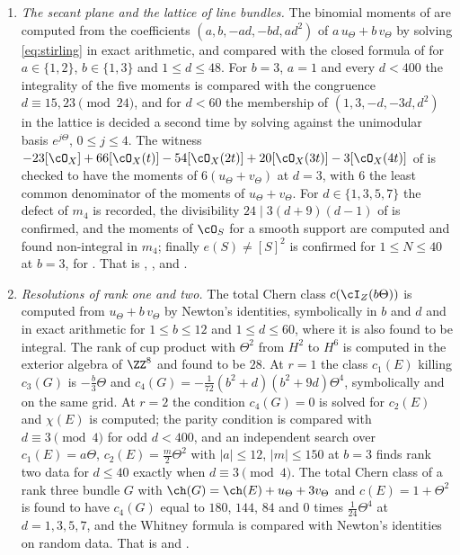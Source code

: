 \begin{enumerate}[label=\textup{(\Roman*)},leftmargin=*]
\item \emph{The secant plane and the lattice of line bundles.} The binomial
  moments of  are computed from the coefficients
  $(a,b,-ad,-bd,ad^{2})$ of $a\,u_{\Theta}+b\,v_{\Theta}$ by solving
  \eqref{eq:stirling} in exact arithmetic, and compared with the closed
  formula of  for $a\in\{1,2\}$, $b\in\{1,3\}$ and
  $1\le d\le48$. For $b=3$, $a=1$ and every $d<400$ the integrality of the
  five moments is compared with the congruence $d\equiv15,23\pmod{24}$, and
  for $d<60$ the membership of $(1,3,-d,-3d,d^{2})$ in the lattice is
  decided a second time by solving against the unimodular basis
  $e^{j\Theta}$, $0\le j\le4$. The witness
  $-23[\cO_{X}]+66[\cO_{X}(t)]-54[\cO_{X}(2t)]+20[\cO_{X}(3t)]-3[\cO_{X}(4t)]$
  of  is checked to have the moments of
  $6(u_{\Theta}+v_{\Theta})$ at $d=3$, with $6$ the least common denominator
  of the moments of $u_{\Theta}+v_{\Theta}$. For $d\in\{1,3,5,7\}$ the
  defect of $m_{4}$ is recorded, the divisibility $24\mid3(d+9)(d-1)$ of
   is confirmed, and the moments of $\cO_{S}$ for a
  smooth support are computed and found non-integral in $m_{4}$; finally
  $e(S)\ne[S]^{2}$ is confirmed for $1\le N\le40$ at $b=3$, for
  . That is ,
  ,  and
  .

\item \emph{Resolutions of rank one and two.} The total Chern class
  $c(\cI_{Z}(b\Theta))$ is computed from $u_{\Theta}+b\,v_{\Theta}$ by
  Newton's identities, symbolically in $b$ and $d$ and in exact arithmetic
  for $1\le b\le12$ and $1\le d\le60$, where it is also found to be
  integral. The rank of cup product with $\Theta^{2}$ from $H^{2}$ to
  $H^{6}$ is computed in the exterior algebra of $\ZZ^{8}$ and found to be
  $28$. At $r=1$ the class $c_{1}(E)$ killing $c_{3}(G)$ is $-\frac b3\Theta$
  and $c_{4}(G)=-\frac{1}{72}(b^{2}+d)(b^{2}+9d)\Theta^{4}$, symbolically and
  on the same grid. At $r=2$ the condition $c_{4}(G)=0$ is solved for
  $c_{2}(E)$ and $\chi(E)$ is computed; the parity condition is compared
  with $d\equiv3\pmod4$ for odd $d<400$, and an independent search over
  $c_{1}(E)=a\Theta$, $c_{2}(E)=\frac m2\Theta^{2}$ with $|a|\le12$,
  $|m|\le150$ at $b=3$ finds rank two data for $d\le40$ exactly when
  $d\equiv3\pmod4$. The total Chern class of a rank three bundle $G$ with
  $\ch(G)=\ch(E)+u_{\Theta}+3v_{\Theta}$ and $c(E)=1+\Theta^{2}$ is found to
  have $c_{4}(G)$ equal to $180$, $144$, $84$ and $0$ times
  $\frac1{24}\Theta^{4}$ at $d=1,3,5,7$, and the Whitney formula is compared
  with Newton's identities on random data. That is
   and .
\end{enumerate}

